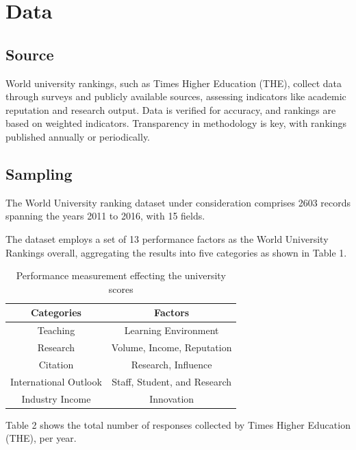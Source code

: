 \documentclass[a4paper]{article}
\begin{document}
\section*{Data}

\subsection* {Source}

World university rankings, such as Times Higher Education (THE)\cite{education_2016}, collect data through surveys and publicly available sources, assessing indicators like academic reputation and research output. Data is verified for accuracy, and rankings are based on weighted indicators. Transparency in methodology is key, with rankings published annually or periodically.

\subsection* {Sampling}
The World University ranking dataset under consideration comprises 2603 records spanning the years 2011 to 2016, with 15 fields. 

The dataset employs a set of 13 performance factors as the World University Rankings overall, aggregating the results into five categories as shown in Table 1.

\begin{table}[h]
    \centering
    \caption{Performance measurement effecting the university scores}
    \begin{tabular}{|c|c|}
        \hline
        \textbf{Categories} & \textbf{Factors} \\
        \hline
        Teaching & Learning Environment \\
        \hline
        Research & Volume, Income, Reputation \\
        \hline
        Citation & Research, Influence \\
        \hline
        International Outlook & Staff, Student, and Research \\
        \hline
        Industry Income & Innovation \\
        \hline
    \end{tabular}
\end{table}

Table 2 shows the total number of responses collected by Times Higher Education (THE), per year.
\end{document}
